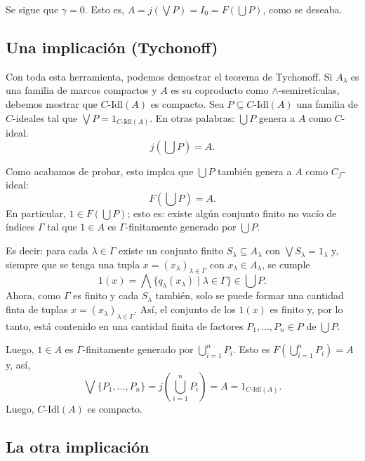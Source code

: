 \documentclass[12pt,letterpaper,titlepage]{article}
\theoremstyle{definition}
\newcommand\Sup{\bigvee}
\renewcommand\inf{\wedge}
\newcommand\Inf{\bigwedge}
\newcommand\<{\langle}
\renewcommand\>{\rangle}
\newcommand\Idl{\text{-}\mathrm{Idl}}
\begin{document}
    Se sigue que $\gamma=0$.
    Esto es, $A=j(\Sup P) = I_0 = F(\bigcup P)$, como se deseaba.

\subsection{Una implicación (Tychonoff)}
    Con toda esta herramienta, podemos demostrar el teorema
    de Tychonoff.
    Si $A_\lambda$ es una familia de marcos compactos y $A$
    es su coproducto como $\inf$-semiretículas,
    debemos mostrar que $C\Idl(A)$ es compacto.
    Sea $P\subseteq C\Idl(A)$ una familia de $C$-ideales tal que
    $\Sup P = 1_{C\Idl(A)}$.
    En otras palabras: $\bigcup P$ genera a $A$ como $C$-ideal.
    \[
        j(\bigcup P) = A
    .\]
    
    Como acabamos de probar, esto implca que $\bigcup P$ también
    genera a $A$ como $C_f$-ideal:
    \[
        F(\bigcup P)=A
    .\]
    En particular, $1\in F(\bigcup P)$; esto es:
    existe algún conjunto finito no vacío de índices $\Gamma$
    tal que $1\in A$ es $\Gamma$-finitamente generado por
    $\bigcup P$.

    Es decir: para cada $\lambda\in\Gamma$ existe un conjunto
    finito $S_\lambda\subseteq A_\lambda$
    con $\Sup S_\lambda = 1_\lambda$
    y, siempre que se tenga una tupla
    $x=(x_\lambda)_{\lambda\in\Gamma}$
    con $x_\lambda\in A_\lambda$,
    se cumple
    \[
        1(x)
        =\Inf\{q_\lambda(x_\lambda)\mid\lambda\in\Gamma\}
        \in\bigcup P
    .\]
    Ahora, como $\Gamma$ es finito y cada $S_\lambda$
    también, solo se puede formar
    una cantidad finta de tuplas
    $x=(x_\lambda)_{\lambda\in\Gamma}$.
    Así, el conjunto de los $1(x)$ es finito y, por lo tanto,
    está contenido en una cantidad finita de factores
    $P_1,\dots,P_n\in P$ de $\bigcup P$.
    
    Luego, $1\in A$ es $\Gamma$-finitamente generado
    por $\bigcup_{i=1}^nP_i$.
    Esto es $F(\bigcup_{i=1}^n P_i)=A$ y, así,
    \[
        \Sup\{P_1,\dots,P_n\}
        = j(\bigcup_{i=1}^nP_i)
        = A
        = 1_{C\Idl(A)}
    .\]
    Luego, $C\Idl(A)$ es compacto.

\subsection{La otra implicación}
\end{document}
